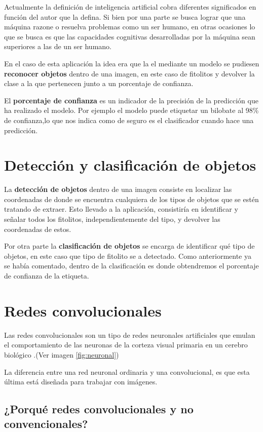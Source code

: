 Actualmente la definición de inteligencia artificial cobra diferentes significados en función del autor que la defina. Si bien por una parte se busca lograr que una máquina razone o resuelva problemas como un ser humano, en otras ocasiones lo que se busca es que las capacidades cognitivas desarrolladas por la máquina sean superiores a las de un ser humano. 

En el caso de esta aplicación la idea era que la el mediante un modelo se pudiesen \textbf{reconocer objetos} dentro de una imagen, en este caso de fitolitos y devolver la clase a la que pertenecen junto a un porcentaje de confianza.

El \textbf{porcentaje de confianza} es un indicador de la precisión de la predicción que ha realizado el modelo. Por ejemplo el modelo puede etiquetar un bilobate al 98\% de confianza,lo que nos indica como de seguro es el clasificador cuando hace una predicción.
\section{Detección y clasificación de objetos}

La \textbf{detección de objetos} dentro de una imagen consiste en localizar las coordenadas de donde se encuentra cualquiera de los tipos de objetos que se estén tratando de extraer. Esto llevado a la aplicación, consistiría en identificar y señalar todos los fitolitos, independientemente del tipo, y devolver las coordenadas de estos. 

Por otra parte la \textbf{clasificación de objetos} se encarga de identificar qué tipo de objetos, en este caso que tipo de fitolito se a detectado. Como anteriormente ya se había comentado, dentro de la clasificación es donde obtendremos el porcentaje de confianza de la etiqueta.

\section{Redes convolucionales}

Las redes convolucionales son un tipo de redes neuronales artificiales que emulan el comportamiento de las neuronas de la corteza visual primaria en un cerebro biológico \cite{redes}.(Ver imagen \ref{fig:neuronal})

La diferencia entre una red neuronal ordinaria y una convolucional, es que esta última está diseñada para trabajar con imágenes.

\subsection{¿Porqué redes convolucionales y no convencionales?}

